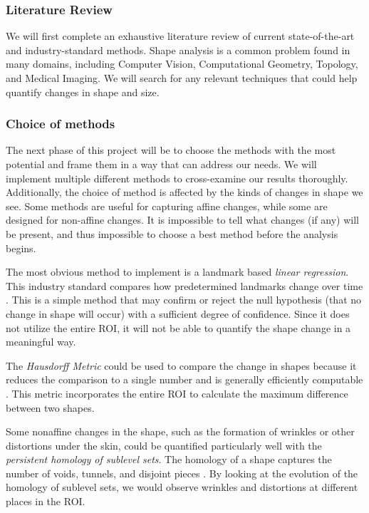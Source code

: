 \documentclass[letterpaper, 12 pt, conference]{ieeeconf}  %
\begin{document}
\subsubsection{Literature Review}

We will first complete an exhaustive literature review of current state-of-the-art and industry-standard methods.   Shape analysis is a common problem found in many domains, including Computer Vision, Computational Geometry, Topology, and Medical Imaging.   We will search for any relevant techniques that could help quantify changes in shape and size.   

\subsubsection{Choice of methods}

The next phase of this project will be to choose the methods with the most potential and frame them in a way that can address our needs.  We will implement multiple different methods to cross-examine our results thoroughly.  Additionally, the choice of method is affected by the kinds of changes in shape we see.  Some methods are useful for capturing affine changes, while some are designed for non-affine changes.  It is impossible to tell what changes (if any) will be present, and thus impossible to choose a best method before the analysis begins.  

The most obvious method to implement is a landmark based \emph{linear regression}.  This industry standard compares how predetermined landmarks change over time \cite{Heimann2009}.  This is a simple method that may confirm or reject the null hypothesis (that no change in shape will occur) with a sufficient degree of confidence. Since it does not utilize the entire \ac{ROI}, it will not be able to quantify the shape change in a meaningful way.  

The \emph{Hausdorff Metric} could be used to compare the change in shapes because it reduces the comparison to a single number and is generally efficiently computable \cite{Chazal2009}.  This metric incorporates the entire \ac{ROI} to calculate the maximum difference between two shapes.

Some nonaffine changes in the shape, such as the formation of wrinkles or other distortions under the skin, could be quantified particularly well with the \emph{persistent homology of sublevel sets}.  The homology of a shape captures the number of voids, tunnels, and disjoint pieces \cite{Carlsson2009} \cite{Edelsbrunner2010}.  By looking at the evolution of the homology of sublevel sets, we would observe wrinkles and distortions at different places in the \ac{ROI}.
\end{document}
